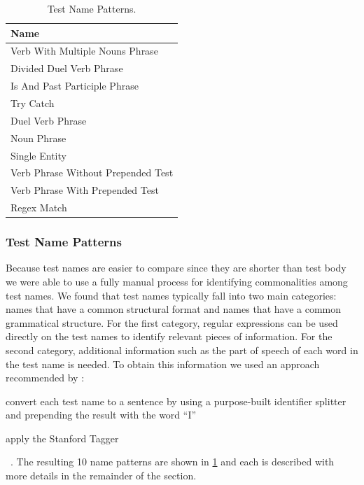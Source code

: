 \documentclass[proposal.tex]{subfiles}
\begin{document}
\begin{table}[t]
\scriptsize
\centering
 \begin{tabular}{l} 
 \toprule
 \textbf{Name} \\
 \midrule
 Verb With Multiple Nouns Phrase \\
 Divided Duel Verb Phrase \\
 Is And Past Participle Phrase \\
 Try Catch \\
 Duel Verb Phrase \\
 Noun Phrase \\
 Single Entity \\
 Verb Phrase Without Prepended Test \\
 Verb Phrase With Prepended Test \\
 Regex Match \\
 \bottomrule
\end{tabular}
\caption{Test Name Patterns.}
\label{tab:name-patterns}
\end{table}




\subsubsection{Test Name Patterns}
\label{sec:name-patterns}


Because test names are easier to compare since they are shorter than test body we were able to use a fully manual process for identifying commonalities among test names.
%
We found that test names typically fall into two main categories: names that have a common structural format and names that have a common grammatical structure.
%
For the first category, regular expressions can be used directly on the test names to identify relevant pieces of information.
%
For the second category, additional information such as the part of speech of each word in the test name is needed.
%
To obtain this information we used an approach recommended by \citeauthor{olney16tagging}:
\begin{enumerate*}
\item convert each test name to a sentence by using a purpose-built identifier splitter and prepending the result with the word \enquote{I}
\item apply the Stanford Tagger~\cite{StanfordTagger}
\end{enumerate*}~\cite{olney16tagging}.
%
The resulting \num{10} name patterns are shown in \cref{tab:name-patterns} and each is described with more details in the remainder of the section.
\end{document}
